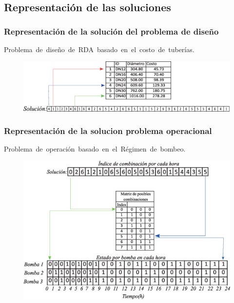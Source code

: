 \documentclass[9pt]{beamer}
\begin{document}
    \subsection{Representación de las soluciones}
    \begin{frame}
        \frametitle{Representación de la solución del problema de diseño}
        Problema de diseño de RDA basado en el costo de tuberías.

        \begin{figure}
            \includegraphics[width=\textwidth]{assets/Anexo/representacion_solucion_monoobjetivo.eps}
        \end{figure}

    \end{frame}

    \begin{frame}
        \frametitle{Representación de la solucion problema operacional}
        Problema de operación basado en el Régimen de bombeo.
        \begin{figure}
            \includegraphics[scale=0.3]{assets/Anexo/representacion_solucion_multiobjetivo.eps}
        \end{figure}

    \end{frame}
\end{document}
